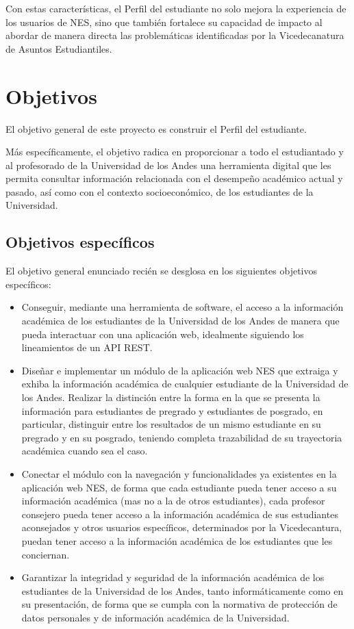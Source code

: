 Con estas características, el Perfil del estudiante no solo mejora la experiencia de los usuarios de NES, sino que también fortalece su capacidad de impacto al abordar de manera directa las problemáticas identificadas por la Vicedecanatura de Asuntos Estudiantiles.

\section{Objetivos}

El objetivo general de este proyecto es construir el Perfil del estudiante.

Más específicamente, el objetivo radica en proporcionar a todo el estudiantado y al profesorado de la Universidad de los Andes una herramienta digital que les permita consultar información relacionada con el desempeño académico actual y pasado, así como con el contexto socioeconómico, de los estudiantes de la Universidad.

\subsection{Objetivos específicos}

El objetivo general enunciado recién se desglosa en los siguientes objetivos específicos:
\begin{itemize}
	\item Conseguir, mediante una herramienta de software, el acceso a la información académica de los estudiantes de la Universidad de los Andes de manera que pueda interactuar con una aplicación web, idealmente siguiendo los lineamientos de un API REST.
	\item Diseñar e implementar un módulo de la aplicación web NES que extraiga y exhiba la información académica de cualquier estudiante de la Universidad de los Andes. Realizar la distinción entre la forma en la que se presenta la información para estudiantes de pregrado y estudiantes de posgrado, en particular, distinguir entre los resultados de un mismo estudiante en su pregrado y en su posgrado, teniendo completa trazabilidad de su trayectoria académica cuando sea el caso.
	\item Conectar el módulo con la navegación y funcionalidades ya existentes en la aplicación web NES, de forma que cada estudiante pueda tener acceso a su información académica (mas no a la de otros estudiantes), cada profesor consejero pueda tener acceso a la información académica de sus estudiantes aconsejados y otros usuarios específicos, determinados por la Vicedecantura, puedan tener acceso a la información académica de los estudiantes que les conciernan.
	\item Garantizar la integridad y seguridad de la información académica de los estudiantes de la Universidad de los Andes, tanto informáticamente como en su presentación, de forma que se cumpla con la normativa de protección de datos personales y de información académica de la Universidad.
\end{itemize}

